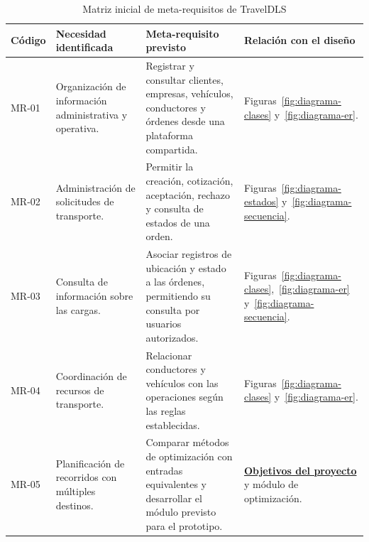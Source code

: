 \begin{table}[H]
	\centering
	\caption{Matriz inicial de meta-requisitos de TravelDLS}
	\label{tab:meta-requisitos-traveldls}

	\small
	\setlength{\tabcolsep}{4.5pt}
	\renewcommand{\arraystretch}{1.45}

	\begin{tabularx}{\textwidth}{
			@{}
			>{\RaggedRight\arraybackslash}p{1.35cm}
			>{\RaggedRight\arraybackslash}p{3.05cm}
			>{\RaggedRight\arraybackslash}X
			>{\RaggedRight\arraybackslash}p{2.85cm}
			@{}
		}

		\toprule

		\textbf{Código} &
		\textbf{Necesidad identificada} &
		\textbf{Meta-requisito previsto} &
		\textbf{Relación con el diseño} \\

		\midrule

		MR-01 &
		Organización de información administrativa y operativa. &
		Registrar y consultar clientes, empresas, vehículos, conductores y órdenes desde una plataforma compartida. &
		Figuras~\ref{fig:diagrama-clases} y~\ref{fig:diagrama-er}. \\

		\midrule

		MR-02 &
		Administración de solicitudes de transporte. &
		Permitir la creación, cotización, aceptación, rechazo y consulta de estados de una orden. &
		Figuras~\ref{fig:diagrama-estados} y~\ref{fig:diagrama-secuencia}. \\

		\midrule

		MR-03 &
		Consulta de información sobre las cargas. &
		Asociar registros de ubicación y estado a las órdenes, permitiendo su consulta por usuarios autorizados. &
		Figuras~\ref{fig:diagrama-clases},~\ref{fig:diagrama-er} y~\ref{fig:diagrama-secuencia}. \\

		\midrule

		MR-04 &
		Coordinación de recursos de transporte. &
		Relacionar conductores y vehículos con las operaciones según las reglas establecidas. &
		Figuras~\ref{fig:diagrama-clases} y~\ref{fig:diagrama-er}. \\

		\midrule

		MR-05 &
		Planificación de recorridos con múltiples destinos. &
		Comparar métodos de optimización con entradas equivalentes y desarrollar el módulo previsto para el prototipo. &
		\textbf{\hyperref[sec:objetivos-especificos]{Objetivos del proyecto}} y módulo de optimización. \\


\end{tabularx}
\end{table}
